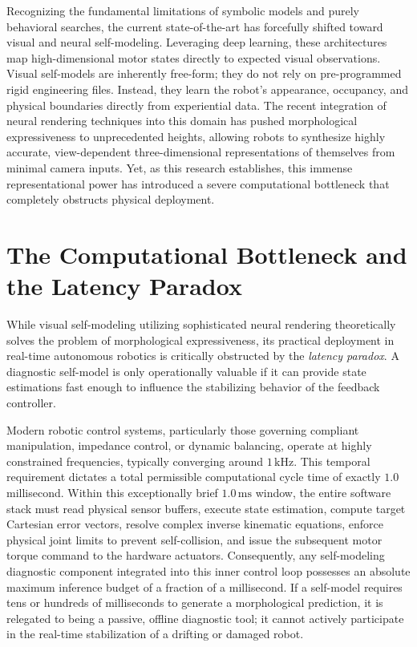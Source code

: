 \documentclass[12pt,a4paper,oneside]{report}
\begin{document}
Recognizing the fundamental limitations of symbolic models and purely behavioral searches, the current state-of-the-art has forcefully shifted toward visual and neural self-modeling. Leveraging deep learning, these architectures map high-dimensional motor states directly to expected visual observations. Visual self-models are inherently free-form; they do not rely on pre-programmed rigid engineering files. Instead, they learn the robot's appearance, occupancy, and physical boundaries directly from experiential data. The recent integration of neural rendering techniques into this domain has pushed morphological expressiveness to unprecedented heights, allowing robots to synthesize highly accurate, view-dependent three-dimensional representations of themselves from minimal camera inputs. Yet, as this research establishes, this immense representational power has introduced a severe computational bottleneck that completely obstructs physical deployment.

\section{The Computational Bottleneck and the Latency Paradox}

While visual self-modeling utilizing sophisticated neural rendering theoretically solves the problem of morphological expressiveness, its practical deployment in real-time autonomous robotics is critically obstructed by the \textit{latency paradox}. A diagnostic self-model is only operationally valuable if it can provide state estimations fast enough to influence the stabilizing behavior of the feedback controller. 

Modern robotic control systems, particularly those governing compliant manipulation, impedance control, or dynamic balancing, operate at highly constrained frequencies, typically converging around $1\,\mathrm{kHz}$. This temporal requirement dictates a total permissible computational cycle time of exactly $1.0$ millisecond. Within this exceptionally brief $1.0\,\mathrm{ms}$ window, the entire software stack must read physical sensor buffers, execute state estimation, compute target Cartesian error vectors, resolve complex inverse kinematic equations, enforce physical joint limits to prevent self-collision, and issue the subsequent motor torque command to the hardware actuators. Consequently, any self-modeling diagnostic component integrated into this inner control loop possesses an absolute maximum inference budget of a fraction of a millisecond. If a self-model requires tens or hundreds of milliseconds to generate a morphological prediction, it is relegated to being a passive, offline diagnostic tool; it cannot actively participate in the real-time stabilization of a drifting or damaged robot.
\end{document}
